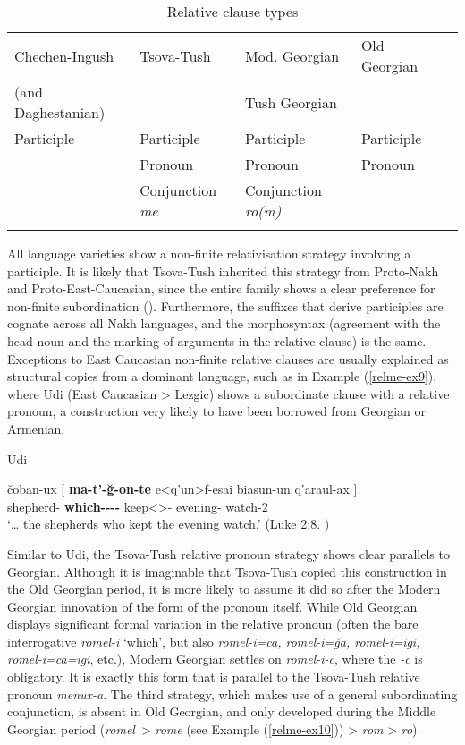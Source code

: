 \begin{table}
	\begin{tabular}{lllll}
    \lsptoprule
		Chechen-Ingush  & {Tsova-Tush} & {Mod. Georgian} &  {Old Georgian} \\
		(and Daghestanian) & & {Tush Georgian} & \\
		\midrule
		Participle & Participle & Participle  & Participle \\
		& Pronoun & Pronoun  & Pronoun \\
		& Conjunction \textit{me} & Conjunction \textit{ro(m)} &  \\	
        \lspbottomrule
	\end{tabular}
	\caption{Relative clause types}
	\label{relme-table1}
\end{table}

All language varieties show a non-finite relativisation strategy involving a participle. It is likely that Tsova-Tush inherited this strategy from Proto-Nakh and Proto-East-Caucasian, since the entire family shows a clear preference for non-finite subordination (\cite[147]{daniellander}). Furthermore, the suffixes that derive participles are cognate across all Nakh languages, and the morphosyntax (agreement with the head noun and the marking of arguments in the relative clause) is the same. Exceptions to East Caucasian non-finite relative clauses are usually explained as structural copies from a dominant language, such as in Example (\ref{relme-ex9}), where Udi (East Caucasian > Lezgic) shows a subordinate clause with a relative pronoun, a construction very likely to have been borrowed from Georgian or Armenian.


	\begin{exe}
		\ex\label{relme-ex9}
		Udi
        
		\gll čoban-ux	{{\normalfont[} \textbf{ma-t'-\u{g}-on-te}}	e<q'un>f-esai		biasun-un	{q'araul-ax {\normalfont]}}.   \\
		shepherd-{\Pl}	\textbf{which-{\Obl}-{\Pl}-{\Erg}-{\Rel}}	keep<{\Tpl}>-{\Imprf}		evening-{\Gen}	watch-{\Dat}2	\\
		\trans `… the shepherds who kept the evening watch.’ 
		\hfill (Luke 2:8. \cite{schulzeudigrammar})
	\end{exe}


Similar to Udi, the Tsova-Tush relative pronoun strategy shows clear parallels to Georgian. Although it is imaginable that Tsova-Tush copied this construction in the Old Georgian period, it is more likely to assume it did so after the Modern Georgian innovation of the form of the pronoun itself. While Old Georgian displays significant formal variation in the relative pronoun (often the bare interrogative \textit{romel-i} ‘which’, but also \textit{romel-i=ca, romel-i=\u{g}a, romel-i=igi, romel-i=ca=igi}, etc.), Modern Georgian settles on \textit{romel-i-c}, where the \textit{-c} is obligatory. It is exactly this form that is parallel to the Tsova-Tush relative pronoun \textit{menux-a}. The third strategy, which makes use of a general subordinating conjunction, is absent in Old Georgian, and only developed during the Middle Georgian period (\textit{romel}~> \textit{rome} (see Example (\ref{relme-ex10})) > \textit{rom} > \textit{ro}). 

